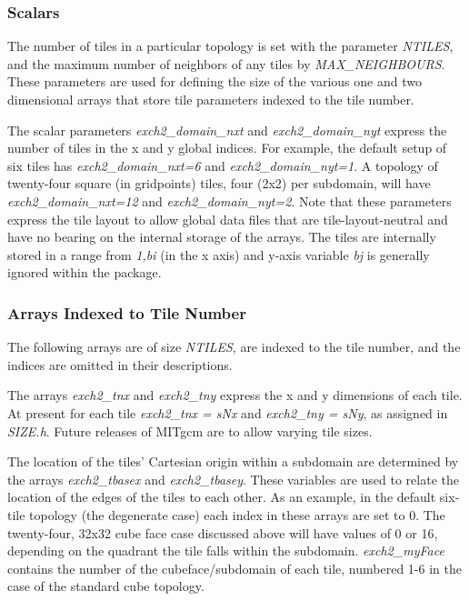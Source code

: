 \subsubsection{Scalars}

The number of tiles in a particular topology is set with the parameter
{\em NTILES}, and the maximum number of neighbors of any tiles by 
{\em MAX\_NEIGHBOURS}.  These parameters are used for defining the size of
the various one and two dimensional arrays that store tile parameters
indexed to the tile number.

The scalar parameters {\em exch2\_domain\_nxt} and 
{\em exch2\_domain\_nyt} express the number of tiles in the x and y global
indices.  For example, the default setup of six tiles has 
{\em exch2\_domain\_nxt=6} and {\em exch2\_domain\_nyt=1}.  A topology of
twenty-four square (in gridpoints) tiles, four (2x2) per subdomain, will
have {\em exch2\_domain\_nxt=12} and {\em exch2\_domain\_nyt=2}.  Note 
that these parameters express the tile layout to allow global data files that
are tile-layout-neutral and have no bearing on the internal storage of the
arrays.  The tiles are internally stored in a range from {\em 1,bi} (in the
x axis) and y-axis variable {\em bj} is generally ignored within the package.

\subsubsection{Arrays Indexed to Tile Number}

The following arrays are of size {\em NTILES}, are indexed to the tile number, 
and the indices are omitted in their descriptions.

The arrays {\em exch2\_tnx} and {\em exch2\_tny} 
express the x and y dimensions of each tile.  At present for each tile
{\em exch2\_tnx = sNx} 
and {\em exch2\_tny = sNy}, as assigned in {\em SIZE.h}.  Future releases of 
MITgcm are to allow varying tile sizes.

The location of the tiles' Cartesian origin within a subdomain are determined 
by the arrays {\em exch2\_tbasex} and {\em exch2\_tbasey}.  These variables
are used to relate the location of the edges of the tiles to each other.  As 
an example, in the default six-tile topology (the degenerate case) 
each index in these arrays are 
set to 0.  The twenty-four, 32x32 cube face case discussed above will have
values of 0 or 16, depending on the quadrant the tile falls within the 
subdomain.  {\em exch2\_myFace} contains the number of the 
cubeface/subdomain of each tile, numbered 1-6 in the case of the standard
cube topology.  

